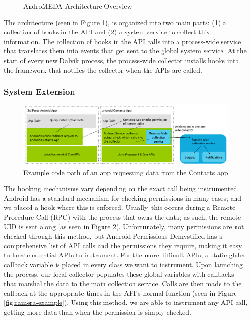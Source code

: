 \documentclass{acm_proc_article-sp}
\begin{document}

\begin{figure}[t]
\begin{center}
\caption{AndroMEDA Architecture Overview}
\label{fig:andromedaoverview}
\end{center}
\end{figure}

The architecture (seen in Figure \ref{fig:andromedaoverview}), is organized into two main parts: (1) a collection of hooks in the API and (2) a system service to collect this information. The collection of hooks in the API calls into a process-wide service that translates them into events that get sent to the global system service. At the start of every new Dalvik process, the process-wide collector installs hooks into the framework that notifies the collector when the APIs are called.

\subsubsection{System Extension}
\begin{figure}[t]
\begin{center}
\includegraphics[width=1.0\columnwidth]{figs/AndroMEDA-Inter-App-Example}
\caption{Example code path of an app requesting data from the Contacts app}
\label{fig:interapp-example}
\end{center}
\end{figure}

The hooking mechanisms vary depending on the exact call being instrumented. Android has a standard mechanism for checking permissions in many cases; and we placed a hook where this is enforced. Usually, this occurs during a Remote Procedure Call (RPC) with the process that owns the data; as such, the remote UID is sent along (as seen in Figure \ref{fig:interapp-example}). Unfortunately, many permissions are not checked through this method, but Android Permissions Demystified\citep{felt2011android} has a comprehensive list of API calls and the permissions they require, making it easy to locate essential APIs to instrument. For the more difficult APIs, a static global callback variable is placed in every class we want to instrument. Upon launching the process, our local collector populates these global variables with callbacks that marshal the data to the main collection service. Calls are then made to the callback at the appropriate times in the API's normal function (seen in Figure \ref{fig:camera-example}). Using this method, we are able to instrument any API call, getting more data than when the permission is simply checked.
\end{document}
